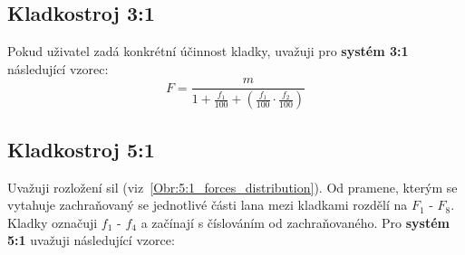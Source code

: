 \subsection{Kladkostroj 3:1}
Pokud uživatel zadá konkrétní účinnost kladky, uvažuji pro \textbf{systém 3:1} následující vzorec:
\begin{equation}
    \label{eqn:calculation_3_1}
    F = \frac{m}{1 + \frac{f_1}{100} + (\frac{f_1}{100} \cdot \frac{f_2}{100})}
\end{equation}
\subsection{Kladkostroj 5:1}
Uvažuji rozložení sil (viz~\autoref{Obr:5:1_forces_distribution}). Od pramene, kterým se vytahuje zachraňovaný se jednotlivé části lana mezi kladkami rozdělí na ${F_1}$ - ${F_8}$. Kladky označuji ${f_1}$ - ${f_4}$ a začínají s číslováním od zachraňovaného. Pro \textbf{systém 5:1} uvažuji následující vzorce:

